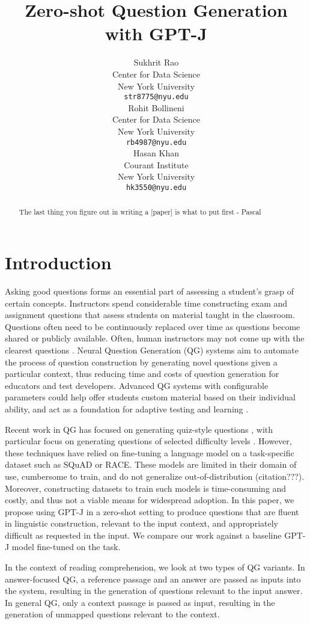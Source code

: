 \documentclass[11pt]{article}
\title{Zero-shot Question Generation with GPT-J}
\author{Sukhrit Rao \\
  Center for Data Science \\
  New York University \\
  \texttt{str8775@nyu.edu} \\\And
  Rohit Bollineni \\
  Center for Data Science \\
  New York University \\
  \texttt{rb4987@nyu.edu} \\\And
  Hasan Khan \\
  Courant Institute \\ 
  New York University \\
  \texttt{hk3550@nyu.edu} \\}
\begin{document}
\maketitle
\begin{abstract}
The last thing you figure out in writing a [paper] is what to put first - Pascal
\end{abstract}

\section{Introduction}

Asking good questions forms an essential part of assessing a student’s grasp of certain concepts. Instructors spend considerable time constructing exam and assignment questions that assess students on material taught in the classroom. Questions often need to be continuously replaced over time as questions become shared or publicly available. Often, human instructors may not come up with the clearest questions \citep{human-eval:7}. Neural Question Generation (QG) systems aim to automate the process of question construction by generating novel questions given a particular context, thus reducing time and costs of question generation for educators and test developers. Advanced QG systems with configurable parameters could help offer students custom material based on their individual ability, and act as a foundation for adaptive testing and learning \citep{adaptive-education:8}. 

Recent work in QG has focused on generating quiz-style questions \citep{Quiz:1}, with particular focus on generating questions of selected difficulty levels \citep{Difficulty:3}. However, these techniques have relied on fine-tuning a language model on a task-specific dataset such as SQuAD or RACE. These models are limited in their domain of use, cumbersome to train, and do not generalize out-of-distribution (citation???). Moreover, constructing datasets to train such models is time-consuming and costly, and thus not a viable means for widespread adoption. In this paper, we propose using GPT-J in a zero-shot setting to produce questions that are fluent in linguistic construction, relevant to the input context, and appropriately difficult as requested in the input. We compare our work against a baseline GPT-J model fine-tuned on the task.

In the context of reading comprehension, we look at two types of QG variants. In answer-focused QG, a reference passage and an answer are passed as inputs into the system, resulting in the generation of questions relevant to the input answer. In general QG, only a context passage is passed as input, resulting in the generation of unmapped questions relevant to the context.
\end{document}
